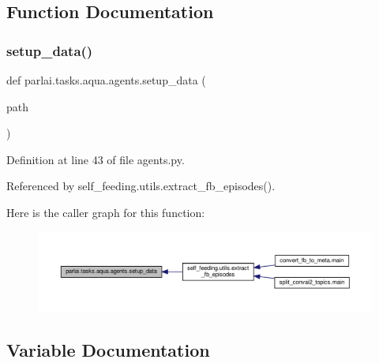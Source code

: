 \subsection{Function Documentation}
\mbox{\label{namespaceparlai_1_1tasks_1_1aqua_1_1agents_a2d4e9f4e80d4edc0646c7e3d52be9f25}} 
\subsubsection{\texorpdfstring{setup\+\_\+data()}{setup\_data()}}
{\footnotesize\ttfamily def parlai.\+tasks.\+aqua.\+agents.\+setup\+\_\+data (\begin{DoxyParamCaption}\item[{}]{path }\end{DoxyParamCaption})}



Definition at line 43 of file agents.\+py.



Referenced by self\+\_\+feeding.\+utils.\+extract\+\_\+fb\+\_\+episodes().

Here is the caller graph for this function\+:
\nopagebreak
\begin{figure}[H]
\begin{center}
\leavevmode
\includegraphics[width=350pt]{namespaceparlai_1_1tasks_1_1aqua_1_1agents_a2d4e9f4e80d4edc0646c7e3d52be9f25_icgraph}
\end{center}
\end{figure}


\subsection{Variable Documentation}
\mbox{\label{namespaceparlai_1_1tasks_1_1aqua_1_1agents_ac1c607195fc8111cc32f83b710ae8ef8}} 
